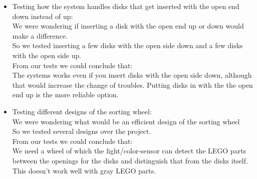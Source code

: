 \begin{itemize}
\item{Testing how the system handles disks that get inserted with the open end down instead of up:\\
We were wondering if inserting a disk with the open end up or down would make a difference.\\
So we tested inserting a few disks with the open side down and a few disks with the open side up.\\
From our tests we could conclude that:\\
The systems works even if you insert disks with the open side down, although that would increase the change of troubles. Putting disks in with the the open end up is the more reliable option.}\\


\item{Testing different designs of the sorting wheel:\\
We were wondering what would be an efficient design of the sorting wheel\\
So we tested several designs over the project.\\
From our tests we could conclude that:\\
We need a wheel of which the light/color-sensor can detect the LEGO parts between the openings for the disks and distinguish that from the disks itself. This doesn't work well with gray LEGO parts.}\\


\end{itemize}

